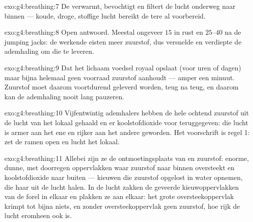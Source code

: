 \begin{solution}{exo:g4:breathing:7}
De  verwarmt, bevochtigt en filtert de lucht onderweg naar binnen
--- koude, droge, stoffige lucht bereikt de tere  al voorbereid.
\end{solution}

\begin{solution}{exo:g4:breathing:8}
Open antwoord. Meestal ongeveer $15$ in rust en $25$--$40$ na de jumping
jacks: de werkende  eisten meer zuurstof, dus versnelde en
verdiepte de ademhaling om die te leveren.
\end{solution}

\begin{solution}{exo:g4:breathing:9}
Dat het lichaam voedsel royaal opslaat (voor uren of dagen) maar bijna
helemaal geen voorraad zuurstof aanhoudt --- amper een minuut. Zuurstof
moet daarom voortdurend geleverd worden, teug na teug, en daarom kan de
ademhaling nooit lang pauzeren.
\end{solution}

\begin{solution}{exo:g4:breathing:10}
Vijfentwintig ademhalers hebben de hele ochtend zuurstof uit de lucht
van het lokaal gehaald en er koolstofdioxide voor teruggegeven: die
lucht is armer aan het ene en rijker aan het andere geworden. Het
voorschrift is regel 1: zet de ramen open en lucht het lokaal.
\end{solution}

\begin{solution}{exo:g4:breathing:11}
Allebei zijn ze de ontmoetingsplaats van  en zuurstof: enorme,
dunne, met  doorregen oppervlakken waar zuurstof naar binnen
oversteekt en koolstofdioxide naar buiten --- kieuwen die zuurstof
opgelost in water opnemen,  die haar uit de lucht halen. In de
lucht zakken de geveerde kieuwoppervlakken van de forel in elkaar en
plakken ze aan elkaar: het grote oversteekoppervlak krimpt tot bijna
niets, en zonder oversteekoppervlak geen zuurstof, hoe rijk de lucht
eromheen ook is.
\end{solution}
